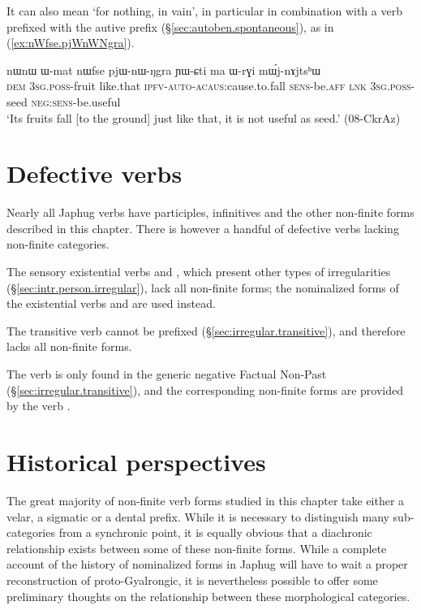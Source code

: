 It can also mean `for nothing, in vain', in particular in combination with a verb prefixed with the autive prefix (§\ref{sec:autoben.spontaneous}),  as in (\ref{ex:nWfse.pjWnWNgra}).

\begin{exe}
\ex \label{ex:nWfse.pjWnWNgra}
\gll nɯnɯ ɯ-mat nɯfse pjɯ-nɯ-ŋgra ɲɯ-ɕti ma ɯ-rɣi mɯ́j-nɤjtsʰɯ \\
\textsc{dem} \textsc{3sg}.\textsc{poss}-fruit like.that \textsc{ipfv}-\textsc{auto}-\textsc{acaus}:cause.to.fall \textsc{sens}-be.\textsc{aff} \textsc{lnk} \textsc{3sg}.\textsc{poss}-seed \textsc{neg}:\textsc{sens}-be.useful \\
\glt `Its fruits fall [to the ground] just like that, it is not useful as seed.' (08-CkrAz)
\end{exe}  


\section{Defective verbs} \label{sec:nmlz.defective}
Nearly all Japhug verbs have participles, infinitives and the other non-finite forms described in this chapter. There is however a handful of defective verbs lacking non-finite categories. 

The sensory existential verbs  and , which present other types of irregularities (§\ref{sec:intr.person.irregular}), lack all non-finite forms; the nominalized forms of the existential verbs  and  are used instead.

The transitive verb  cannot be prefixed (§\ref{sec:irregular.transitive}), and therefore lacks all non-finite forms.

The verb  is only found in the generic negative Factual Non-Past (§\ref{sec:irregular.transitive}), and the corresponding non-finite forms are provided by the verb .

\section{Historical perspectives} \label{sec:nmlz.historical.perspectives}
The great majority of non-finite verb forms studied in this chapter take either a velar, a sigmatic or a dental prefix. While it is necessary to distinguish many sub-categories from a synchronic point, it is equally obvious that a diachronic relationship exists between some of these non-finite forms. While a complete account of the history of nominalized forms in Japhug will have to wait a proper reconstruction of proto-Gyalrongic, it is nevertheless possible to offer some preliminary thoughts on the relationship between these morphological categories.

